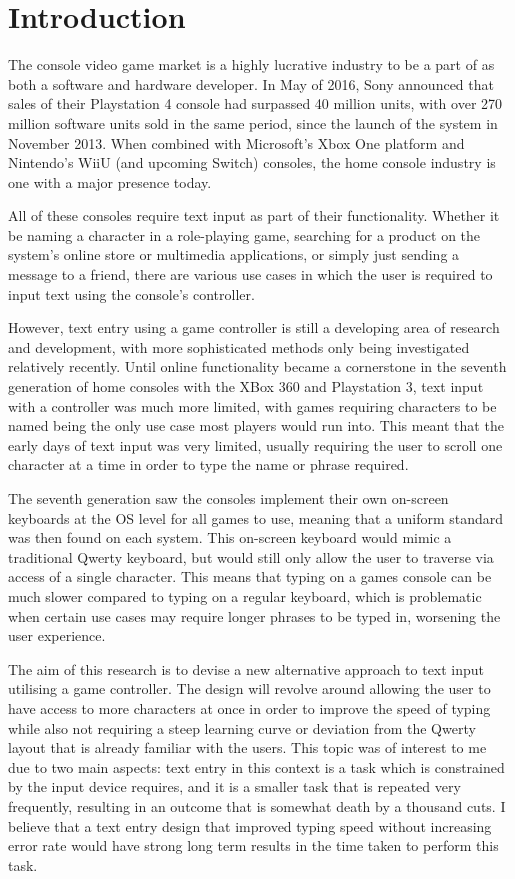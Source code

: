 \documentclass[requirements.tex]{subfiles}
\begin{document}
\section{Introduction} %
\label{sec:introduction}

The console video game market is a highly lucrative industry to be a part of as
both a software and hardware developer. In May of 2016, Sony announced that
sales of their Playstation 4 console had surpassed 40 million units, with over
270 million software units sold in the same period, since the launch of the
system in November 2013\cite{sony}. When combined with Microsoft's Xbox One
platform and Nintendo's WiiU (and upcoming Switch) consoles, the home console
industry is one with a major presence today.

All of these consoles require text input as part of their functionality. Whether
it be naming a character in a role-playing game, searching for a product on the
system's online store or multimedia applications, or simply just sending a
message to a friend, there are various use cases in which the user is required
to input text using the console's controller.

However, text entry using a game controller is still a developing area of
research and development, with more sophisticated methods only being
investigated relatively recently. Until online functionality became a
cornerstone in the seventh generation of home consoles with the XBox 360 and
Playstation 3, text input with a controller was much more limited, with games
requiring characters to be named being the only use case most players would
run into. This meant that the early days of text input was very limited, usually
requiring the user to scroll one character at a time in order to type the name
or phrase required.

The seventh generation saw the consoles implement their own on-screen keyboards
at the OS level for all games to use, meaning that a uniform standard was then
found on each system. This on-screen keyboard would mimic a traditional Qwerty
keyboard, but would still only allow the user to traverse via access of a single
character. This means that typing on a games console can be much slower compared
to typing on a regular keyboard, which is problematic when certain use cases may
require longer phrases to be typed in, worsening the user experience.

The aim of this research is to devise a new alternative approach to text input
utilising a game controller. The design will revolve around allowing the user
to have access to more characters at once in order to improve the speed of
typing while also not requiring a steep learning curve or deviation from the
Qwerty layout that is already familiar with the users. This topic was of
interest to me due to two main aspects: text entry in this context is a task
which is constrained by the input device requires, and it is a smaller task
that is repeated very frequently, resulting in an outcome that is somewhat death
by a thousand cuts. I believe that a text entry design that improved typing
speed without increasing error rate would have strong long term results in the
time taken to perform this task.
\end{document}
